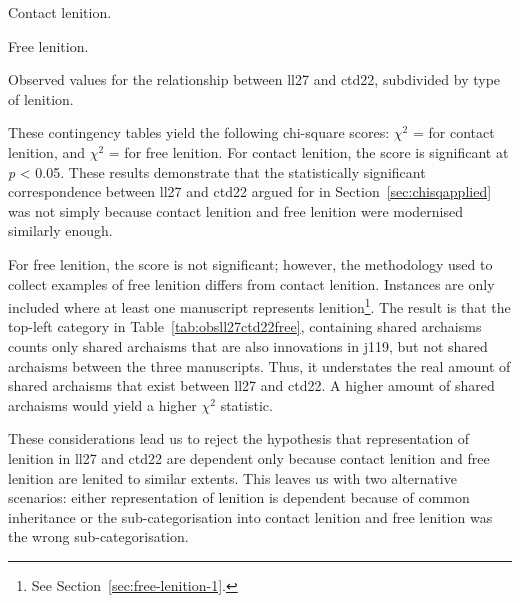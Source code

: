\begin{table}[h]
  \begin{subtable}[b]{0.5\linewidth}
    \centering
    
    \caption{Contact lenition.}
    \label{tab:contactlentab}
  \end{subtable}%
  \begin{subtable}[b]{0.5\linewidth}
    \centering
    
    \caption{Free lenition.}
    \label{tab:obsll27ctd22free}
  \end{subtable}
  \caption{Observed values for the relationship between  \acrshort{ll27} and \acrshort{ctd22}, subdivided by type of lenition.}
  \label{tab:obsll27ctd22freecontact}
\end{table}

 These contingency tables yield the following chi-square scores: \(\chi^2\) =  for contact lenition, and \(\chi^2\) =  for free lenition. For contact lenition, the score is significant at \emph{p} < 0.05. These results  demonstrate that the statistically significant correspondence between \gls{ll27} and \gls{ctd22} argued for in Section~\ref{sec:chisqapplied} was not simply because contact lenition and free lenition were modernised similarly enough. 

For free lenition, the score is not significant; however, the methodology used to collect examples of free lenition differs from contact lenition. Instances are only included where at least one manuscript represents lenition\footnote{See Section~\ref{sec:free-lenition-1}.}. The result is that the top-left category in Table~\ref{tab:obsll27ctd22free}, containing shared archaisms counts only shared archaisms that are also innovations in \gls{j119}, but not shared archaisms between the three manuscripts. Thus, it understates the real amount of shared archaisms that exist between \gls{ll27} and \gls{ctd22}. A higher amount of shared archaisms would yield a higher \(\chi^2\) statistic.

These considerations lead us to reject the hypothesis that representation of lenition in \gls{ll27} and \gls{ctd22} are dependent only because contact lenition and free lenition are lenited to similar extents. This leaves us with two alternative scenarios: either representation of lenition is dependent because of common inheritance or the sub-categorisation into contact lenition and free lenition was the wrong sub-categorisation.

